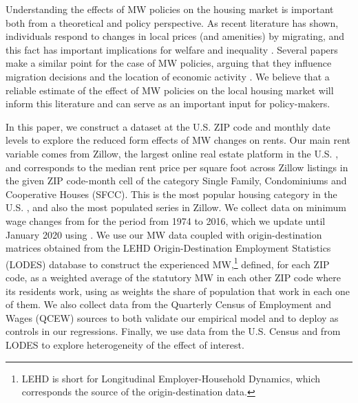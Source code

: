 Understanding the effects of MW policies on the housing market is important both from a 
theoretical and policy perspective. As recent literature has shown, individuals 
respond to changes in local prices (and amenities) by migrating, and this fact has important 
implications for welfare and inequality \parencite{Diamond2016, Couture2019}. Several papers 
make a similar point for the case of MW policies, arguing that they influence migration 
decisions and the location of economic activity \parencite{PerezPerez2018, Monras2019}. We 
believe that a reliable estimate of the effect of MW policies on the local housing market 
will inform this literature and can serve as an important input for policy-makers.
 
In this paper, we construct a dataset at the U.S. ZIP code and monthly date levels to explore 
the reduced form effects of MW changes on rents. Our main rent variable comes from Zillow, 
the largest online real estate platform in the U.S. \parencite{realestateagentpdx, investopedia}, 
and corresponds to the median rent price per square foot across Zillow listings in the given 
ZIP code-month cell of the category Single Family, Condominiums and Cooperative Houses (SFCC). 
This is the most popular housing category in the U.S. \parencite{fernald2020americas}, 
and also the most populated series in Zillow. We collect data on minimum wage changes from 
\textcite{VaghulZipperer2016} for the period from 1974 to 2016, which we update until January 
2020 using \textcite{BerkeleyLaborCenter}. We use our MW data coupled with origin-destination
matrices obtained from the LEHD Origin-Destination Employment Statistics (LODES) database to 
construct the experienced MW,\footnote{LEHD is short for Longitudinal Employer-Household 		
	Dynamics, which corresponds the source of the origin-destination data.}
defined, for each ZIP code, as a weighted average of the statutory MW in each other ZIP code
where its residents work, using as weights the share of population that work in each one of
them. We also collect data from the Quarterly Census of Employment and Wages (QCEW) sources 
to both validate our empirical model and to deploy as controls in our regressions. Finally, 
we use data from the U.S. Census and from LODES to explore heterogeneity of the effect of 
interest.

